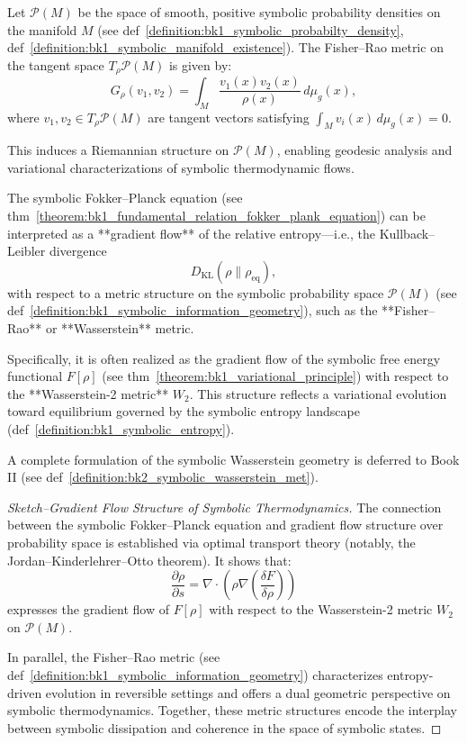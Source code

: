\begin{definition}
\label{definition:bk1_symbolic_information_geometry}
Let $\mathcal{P}(M)$ be the space of smooth, positive symbolic probability densities on the manifold $M$ (see def~\ref{definition:bk1_symbolic_probabilty_density}, def~\ref{definition:bk1_symbolic_manifold_existence}). The Fisher–Rao metric on the tangent space $T_{\rho} \mathcal{P}(M)$ is given by:
\[
G_{\rho}(v_1, v_2) = \int_M \frac{v_1(x) v_2(x)}{\rho(x)} \, d\mu_g(x),
\]
where $v_1, v_2 \in T_\rho \mathcal{P}(M)$ are tangent vectors satisfying $\int_M v_i(x) \, d\mu_g(x) = 0$.

This induces a Riemannian structure on $\mathcal{P}(M)$, enabling geodesic analysis and variational characterizations of symbolic thermodynamic flows.
\end{definition}
\begin{theorem}
\label{theorem:bk1_the_fokker_planck_equation_theorem}
The symbolic Fokker–Planck equation (see thm~\ref{theorem:bk1_fundamental_relation_fokker_plank_equation}) can be interpreted as a **gradient flow** of the relative entropy—i.e., the Kullback–Leibler divergence
\[
D_{\mathrm{KL}}(\rho \| \rho_{\text{eq}}),
\]
with respect to a metric structure on the symbolic probability space $\mathcal{P}(M)$ (see def~\ref{definition:bk1_symbolic_information_geometry}), such as the **Fisher–Rao** or **Wasserstein** metric.

Specifically, it is often realized as the gradient flow of the symbolic free energy functional $F[\rho]$ (see thm~\ref{theorem:bk1_variational_principle}) with respect to the **Wasserstein-2 metric** $W_2$. This structure reflects a variational evolution toward equilibrium governed by the symbolic entropy landscape (def~\ref{definition:bk1_symbolic_entropy}).

A complete formulation of the symbolic Wasserstein geometry is deferred to Book II (see def~\ref{definition:bk2_symbolic_wasserstein_met}).
\begin{proof}[Sketch–Gradient Flow Structure of Symbolic Thermodynamics]
\label{proof:bk1_sketch_gradient_flow_thermodynamics}
The connection between the symbolic Fokker–Planck equation and gradient flow structure over probability space is established via optimal transport theory (notably, the Jordan–Kinderlehrer–Otto theorem). It shows that:
\[
\frac{\partial \rho}{\partial s} = \nabla \cdot \left( \rho \nabla \left( \frac{\delta F}{\delta \rho} \right) \right)
\]
expresses the gradient flow of $F[\rho]$ with respect to the Wasserstein-2 metric $W_2$ on $\mathcal{P}(M)$.

In parallel, the Fisher–Rao metric (see def~\ref{definition:bk1_symbolic_information_geometry}) characterizes entropy-driven evolution in reversible settings and offers a dual geometric perspective on symbolic thermodynamics. Together, these metric structures encode the interplay between symbolic dissipation and coherence in the space of symbolic states.
\end{proof}
\end{theorem}
